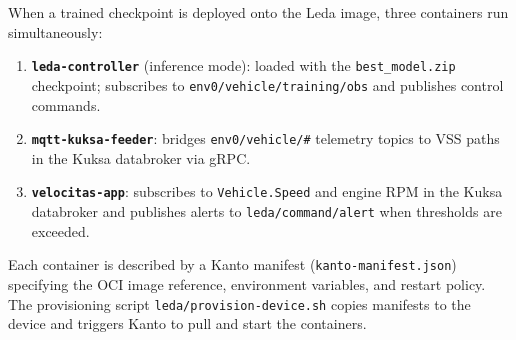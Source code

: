 When a trained checkpoint is deployed onto the Leda image, three
containers run simultaneously:
\begin{enumerate}[leftmargin=2cm,topsep=1.15pt,itemsep=1.15pt,partopsep=1.15pt,parsep=1.15pt]
  \item \textbf{\texttt{leda-controller}} (inference mode): loaded with
    the \texttt{best\_model.zip} checkpoint; subscribes to
    \texttt{env0/vehicle/training/obs} and publishes control commands.
  \item \textbf{\texttt{mqtt-kuksa-feeder}}: bridges
    \texttt{env0/vehicle/\#} telemetry topics to VSS paths in the Kuksa
    databroker via gRPC.
  \item \textbf{\texttt{velocitas-app}}: subscribes to
    \texttt{Vehicle.Speed} and engine RPM in the Kuksa databroker and
    publishes alerts to \texttt{leda/command/alert} when thresholds are
    exceeded.
\end{enumerate}
Each container is described by a Kanto manifest
(\texttt{kanto-manifest.json}) specifying the OCI image reference,
environment variables, and restart policy. The provisioning script
\texttt{leda/provision-device.sh} copies manifests to the device and
triggers Kanto to pull and start the containers.

